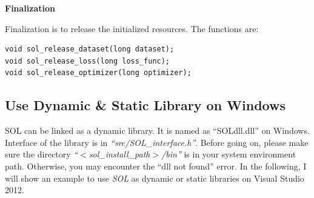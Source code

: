 \documentclass[11pt,a4paper]{article}
\begin{document}
\vspace{4mm}\hspace{-5mm}\textbf{Finalization}
\vspace{2mm}

Finalization is to release the initialized resources. The functions are:
\lstset{language=C++}
\begin{lstlisting}
void sol_release_dataset(long dataset);
void sol_release_loss(long loss_func);
void sol_release_optimizer(long optimizer);
\end{lstlisting}

\subsection{Use Dynamic \& Static Library on Windows}
SOL can be linked as a dynamic library. It is named as ``SOLdll.dll'' on
Windows.  Interface of the library is in \emph{``src/SOL\_interface.h''}.
Before going on, please make sure the directory \emph{``$<$sol\_install\_path$>$/bin''} is in your system
environment path. Otherwise, you may encounter the ``dll not found'' error.
In the following, I will show an example to use \emph{SOL} as dynamic or static
libraries on Visual Studio 2012.
\end{document}
